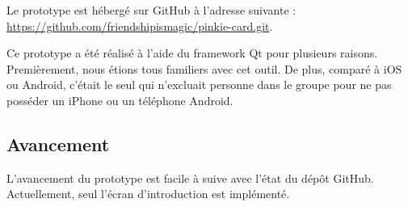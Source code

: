 \documentclass[a4paper,12pt]{article}
\begin{document}
Le prototype est hébergé sur GitHub à l'adresse suivante : \\
\url{https://github.com/friendshipismagic/pinkie-card.git}.

Ce prototype a été réalisé à l'aide du framework Qt pour plusieurs raisons. Premièrement, nous étions tous familiers
avec cet outil. De plus, comparé à iOS ou Android, c'était le seul qui n'excluait personne dans le groupe pour ne pas
posséder un iPhone ou un téléphone Android.

\subsection{Avancement}

L'avancement du prototype est facile à suive avec l'état du dépôt GitHub. Actuellement, seul l'écran d'introduction
est implémenté.
\end{document}
